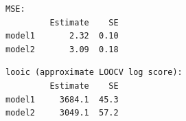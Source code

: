 \begin{frame}[fragile]
\begin{analysis}

\bigskip

\begin{verbatim}
MSE:
         Estimate    SE
model1       2.32  0.10
model2       3.09  0.18
\end{verbatim}\pause

\begin{verbatim}
looic (approximate LOOCV log score):
         Estimate    SE
model1     3684.1  45.3
model2     3049.1  57.2
\end{verbatim}

\bigskip

\end{analysis}
\end{frame}



